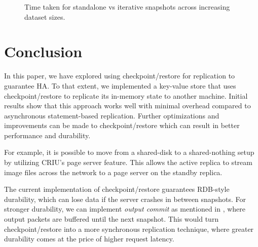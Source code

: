 \documentclass[final]{proc}
\begin{document}
\begin{figure}
  \centering
  \caption{Time taken for standalone vs iterative snapshots across increasing
  dataset sizes.}
  \label{fig:iterative}
\end{figure}

\section{Conclusion}

In this paper, we have explored using checkpoint/restore for replication to
guarantee HA. To that extent, we implemented a key-value store that uses
checkpoint/restore to replicate its in-memory state to another machine. Initial
results show that this approach works well with minimal overhead compared to
asynchronous statement-based replication. Further optimizations and improvements
can be made to checkpoint/restore which can result in better performance and
durability.

For example, it is possible to move from a shared-disk to a shared-nothing setup
by utilizing CRIU's page server feature. This allows the active replica to
stream image files across the network to a page server on the standby replica.

The current implementation of checkpoint/restore guarantees RDB-style
durability, which can lose data if the server crashes in between snapshots. For
stronger durability, we can implement \textit{output commit} as mentioned in
\cite{RemusDB}, where output packets are buffered until the next snapshot. This
would turn checkpoint/restore into a more synchronous replication technique,
where greater durability comes at the price of higher request latency.
\end{document}
